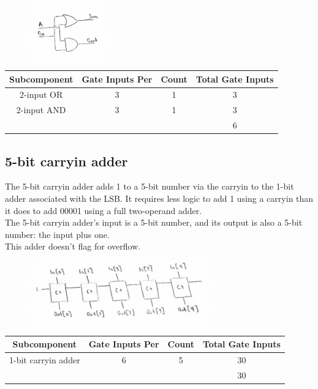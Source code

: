\documentclass{article}
\begin{document}
\begin{figure}[!ht]
\centering
\includegraphics[width=0.3\textwidth]{img/1b-cin-add}
\label{fig:1b-cin-add}
\end{figure}

\begin{center}
\begin{tabular}{ ccc|c }
 \textbf{Subcomponent} & \textbf{Gate Inputs Per} & \textbf{Count} & \textbf{Total Gate Inputs} \\
 \hline
 2-input OR & 3 & 1 & 3 \\
 2-input AND & 3 & 1 & 3 \\
 \hline
 &&& 6\\
\end{tabular}
\end{center}

\subsection{5-bit carryin adder}
The 5-bit carryin adder adds 1 to a 5-bit number via the carryin to the 1-bit adder associated with the LSB. It requires less logic to add 1 using a carryin than it does to add 00001 using a full two-operand adder. \\

The 5-bit carryin adder's input is a 5-bit number, and its output is also a 5-bit number: the input plus one.\\

This adder doesn't flag for overflow.\\

\begin{figure}[!ht]
\centering
\includegraphics[width=0.7\textwidth]{img/5b-add1}
\label{fig:5b-add1}
\end{figure}

\begin{center}
\begin{tabular}{ ccc|c }
 \textbf{Subcomponent} & \textbf{Gate Inputs Per} & \textbf{Count} & \textbf{Total Gate Inputs} \\
 \hline
 1-bit carryin adder & 6 & 5 & 30\\
 \hline
 &&& 30\\
\end{tabular}
\end{center}
\end{document}
